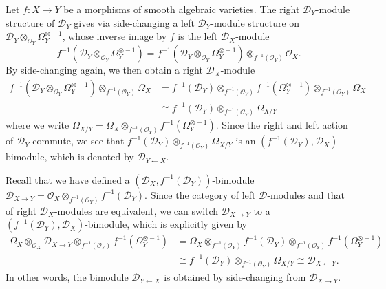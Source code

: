 Let $f:X\to Y$ be a morphisms of smooth algebraic varieties. The right $\mathscr{D}_Y$-module structure of $\mathscr{D}_Y$ gives via side-changing a left $\mathscr{D}_Y$-module structure on $\mathscr{D}_Y\otimes_{\mathscr{O}_Y}\Omega_Y^{\otimes-1}$, whose inverse image by $f$ is the left $\mathscr{D}_X$-module
\[f^{-1}(\mathscr{D}_Y\otimes_{\mathscr{O}_Y}\Omega_Y^{\otimes-1})=f^{-1}(\mathscr{D}_Y\otimes_{\mathscr{O}_Y}\Omega_Y^{\otimes-1})\otimes_{f^{-1}(\mathscr{O}_Y)}\mathscr{O}_X.\]
By side-changing again, we then obtain a right $\mathscr{D}_X$-module
\begin{align*}
f^{-1}(\mathscr{D}_Y\otimes_{\mathscr{O}_Y}\Omega_Y^{\otimes-1})\otimes_{f^{-1}(\mathscr{O}_Y)}\Omega_X&=f^{-1}(\mathscr{D}_Y)\otimes_{f^{-1}(\mathscr{O}_Y)}f^{-1}(\Omega_Y^{\otimes-1})\otimes_{f^{-1}(\mathscr{O}_Y)}\Omega_X\\
&\cong f^{-1}(\mathscr{D}_Y)\otimes_{f^{-1}(\mathscr{O}_Y)}\Omega_{X/Y}
\end{align*}
where we write $\Omega_{X/Y}=\Omega_X\otimes_{f^{-1}(\mathscr{O}_Y)}f^{-1}(\Omega_Y^{\otimes-1})$. Since the right and left action of $\mathscr{D}_Y$ commute, we see that $f^{-1}(\mathscr{D}_Y)\otimes_{f^{-1}(\mathscr{O}_Y)}\Omega_{X/Y}$ is an $(f^{-1}(\mathscr{D}_Y),\mathscr{D}_X)$-bimodule, which is denoted by $\mathscr{D}_{Y\leftarrow X}$.\par

Recall that we have defined a $(\mathscr{D}_X,f^{-1}(\mathscr{D}_Y))$-bimodule $\mathscr{D}_{X\to Y}=\mathscr{O}_X\otimes_{f^{-1}(\mathscr{O}_Y)}f^{-1}(\mathscr{D}_Y)$. Since the category of left $\mathscr{D}$-modules and that of right $\mathscr{D}_X$-modules are equivalent, we can switch $\mathscr{D}_{X\to Y}$ to a $(f^{-1}(\mathscr{D}_Y),\mathscr{D}_X)$-bimodule, which is explicitly given by
\begin{equation}\label{D-module direct and inverse relative module isomorphism}
\begin{aligned}
\Omega_X\otimes_{\mathscr{O}_X}\mathscr{D}_{X\to Y}\otimes_{f^{-1}(\mathscr{O}_Y)}f^{-1}(\Omega_Y^{\otimes-1})&=\Omega_X\otimes_{f^{-1}(\mathscr{O}_Y)}f^{-1}(\mathscr{D}_Y)\otimes_{f^{-1}(\mathscr{O}_Y)}f^{-1}(\Omega_Y^{\otimes-1})\\
&\cong f^{-1}(\mathscr{D}_Y)\otimes_{f^{-1}(\mathscr{O}_Y)}\Omega_{X/Y}\cong\mathscr{D}_{X\leftarrow Y}.
\end{aligned}
\end{equation}
In other words, the bimodule $\mathscr{D}_{Y\leftarrow X}$ is obtained by side-changing from $\mathscr{D}_{X\to Y}$.\par 

